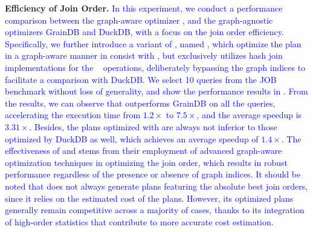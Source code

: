 \noindent\textbf{Efficiency of Join Order.}
\textcolor{blue}{
In this experiment, we conduct a performance comparison between the graph-aware optimizer \name, and the graph-agnostic optimizers GrainDB and DuckDB, with a focus on the join order efficiency.
Specifically, we further introduce a variant of \name, named \relgohash, which optimize the plan in a graph-aware manner in consist with \name, but exclusively utilizes hash join implementations for the \expand~ operations, deliberately bypassing the graph indices to facilitate a comparison with DuckDB.
We select 10 queries from the JOB benchmark without loss of generality, and show the performance results in .
From the results, we can observe that \name outperforms GrainDB on all the queries, accelerating the execution time from $1.2\times$ to $7.5\times$, and the average speedup is $3.31\times$.
Besides, the plans optimized with \relgohash are always not inferior to those optimized by DuckDB as well, which achieves an average speedup of $1.4\times$.
The effectiveness of \name and \relgohash stems from their employment of advanced graph-aware optimization techniques in optimizing the join order, which results in robust performance regardless of the presence or absence of graph indices.
It should be noted that \name does not always generate plans featuring the absolute best join orders, since it relies on the estimated cost of the plans.
However, its optimized plans generally remain competitive across a majority of cases, thanks to its integration of high-order statistics that contribute to more accurate cost estimation.
}


